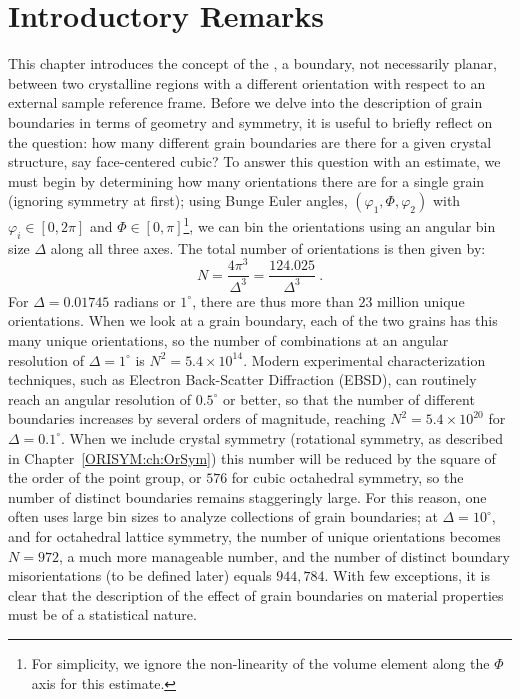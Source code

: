 \section{Introductory Remarks}\label{\chabbr:sec:intro}
This chapter introduces the concept of the , a boundary, not necessarily planar, between two crystalline regions with a different orientation with respect to an external sample reference frame.  Before we delve into the description of grain boundaries in terms of geometry and symmetry, it is useful to briefly reflect on the question: how many different grain boundaries are there for a given crystal structure, say face-centered cubic?  To answer this question with an estimate, we must begin by determining how many orientations there are for a single grain (ignoring symmetry at first); using Bunge Euler angles, $(\varphi_1,\Phi,\varphi_2)$ with $\varphi_i\in[0,2\pi]$ and $\Phi\in[0,\pi]$\footnote{For simplicity, we ignore the non-linearity of the volume element along the $\Phi$ axis for this estimate.}, we can bin the orientations using an angular bin size $\Delta$ along all three axes. The total number of orientations is then given by:
\[
	N=\frac{4\pi^3}{\Delta^3} = \frac{124.025}{\Delta^3}\ .
\]
For $\Delta=0.01745$ radians or $1^{\circ}$, there are thus more than $23$ million unique orientations.  When we look at a grain boundary, each of the two grains has this many unique orientations, so the number of combinations at an angular resolution of $\Delta=1^{\circ}$ is $N^2=5.4\times 10^{14}$.  Modern experimental characterization techniques, such as Electron Back-Scatter Diffraction (EBSD), can routinely reach an angular resolution of $0.5^{\circ}$ or better, so that the number of different boundaries increases by several orders of magnitude, reaching $N^2=5.4\times 10^{20}$ for $\Delta=0.1^{\circ}$.  When we include crystal symmetry (rotational symmetry, as described in Chapter~\ref{ORISYM:ch:OrSym}) this number will be reduced by the square of the order of the point group, or $576$ for cubic octahedral symmetry, so the number of distinct boundaries remains staggeringly large. For this reason, one often uses large bin sizes to analyze collections of grain boundaries; at $\Delta=10^{\circ}$, and for octahedral lattice symmetry, the number of unique orientations becomes $N=972$, a much more manageable number, and the number of distinct boundary misorientations (to be defined later) equals $944,784$.  With few exceptions, it is clear that the description of the effect of grain boundaries on material properties must be of a statistical nature.


